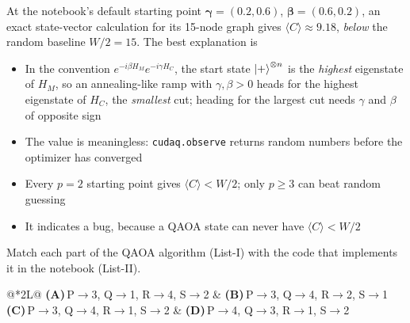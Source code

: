 \documentclass[11pt,a4paper]{article}
\newcommand{\optlabel}[1]{\textbf{(#1)}}
\newenvironment{qitem}[1]{\begin{list}{}{\setlength{\leftmargin}{3.3em}\setlength{\labelwidth}{3.1em}%
  \setlength{\labelsep}{0.2em}\setlength{\topsep}{3pt}\setlength{\parsep}{3pt}}\item[\textbf{Q.#1}\hfill]}{\end{list}}
\newcommand{\qsep}{\par\vspace{2pt}{\color{black!15}\hrule}\vspace{4pt}}
\begin{document}
\begin{qitem}{54}
At the notebook's default starting point $\boldsymbol\gamma = (0.2, 0.6)$, $\boldsymbol\beta = (0.6, 0.2)$, an exact
state-vector calculation for its 15-node graph gives $\langle C\rangle \approx 9.18$, \emph{below} the random baseline $W/2 = 15$.
The best explanation is
\begin{itemize}[leftmargin=2.6em, labelsep=0.4em, itemsep=2pt, topsep=3pt]
\item[\optlabel{A}] In the convention $e^{-i\beta H_M}e^{-i\gamma H_C}$, the start state $\ket+^{\otimes n}$ is the \emph{highest} eigenstate of $H_M$, so an annealing-like ramp with $\gamma, \beta > 0$ heads for the highest eigenstate of $H_C$, the \emph{smallest} cut; heading for the largest cut needs $\gamma$ and $\beta$ of opposite sign
\item[\optlabel{B}] The value is meaningless: \texttt{cudaq.observe} returns random numbers before the optimizer has converged
\item[\optlabel{C}] Every $p = 2$ starting point gives $\langle C\rangle < W/2$; only $p \ge 3$ can beat random guessing
\item[\optlabel{D}] It indicates a bug, because a QAOA state can never have $\langle C\rangle < W/2$
\end{itemize}
\end{qitem}
\qsep

\begin{qitem}{55}
Match each part of the QAOA algorithm (List-I) with the code that implements it in the notebook (List-II).
\par\smallskip{}
\par\smallskip\noindent\begin{tabularx}{\linewidth}{@{}*{2}{L}@{}}
\optlabel{A}\,P$\to$3, Q$\to$1, R$\to$4, S$\to$2 & \optlabel{B}\,P$\to$3, Q$\to$4, R$\to$2, S$\to$1 \\[3pt]
\optlabel{C}\,P$\to$3, Q$\to$4, R$\to$1, S$\to$2 & \optlabel{D}\,P$\to$4, Q$\to$3, R$\to$1, S$\to$2
\end{tabularx}
\end{qitem}
\qsep
\end{document}
